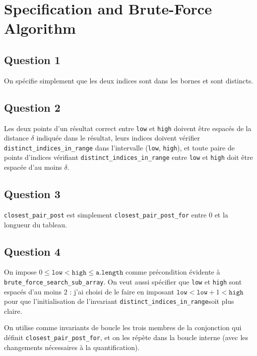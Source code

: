 \documentclass[11pt, openany, a4paper]{article}
\newcommand{\low}{\texttt{low} }
\newcommand{\high}{\texttt{high} }
\newcommand{\alength}{\texttt{a.length} }
\newcommand{\distinrange}{\texttt{distinct\_indices\_in\_range}}
\begin{document}
{\LARGE{}}

\vspace{2em}
	
\section{Specification and Brute-Force Algorithm}

\subsection*{Question 1}

On spécifie simplement que les deux indices sont dans les bornes et sont distincts.

\subsection*{Question 2}

Les deux points d'un résultat correct entre \texttt{low} et \texttt{high} doivent être espacés de la distance $\delta$ indiquée dans le résultat, leurs indices doivent vérifier \texttt{distinct\_indices\_in\_range} dans l'intervalle (\texttt{low}, \texttt{high}), et toute paire de points d'indices vérifiant \texttt{distinct\_indices\_in\_range} entre \texttt{low} et \texttt{high} doit être espacée d'au moins $\delta$.

\subsection*{Question 3}

\texttt{closest\_pair\_post} est simplement \texttt{closest\_pair\_post\_for} entre $0$ et la longueur du tableau.

\subsection*{Question 4}

On impose $0 \leq \low < \high \leq \alength$ comme précondition évidente à \texttt{brute\_force\_search\_sub\_array}. On veut aussi spécifier que \low et \high sont espacés d'au moins $2$ : j'ai choisi de le faire en imposant $\low < \low+1 < \high$ pour que l'initialisation de l'invariant \distinrange soit plus claire. 

On utilise comme invariants de boucle les trois membres de la conjonction qui définit \texttt{closest\_pair\_post\_for}, et on les répète dans la boucle interne (avec les changements nécessaires à la quantification).
\end{document}
